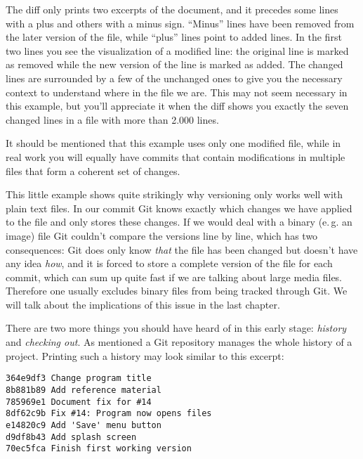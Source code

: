 \documentclass[../../LilyPond-Tutorials]{subfiles}
\begin{document}
The diff only prints two excerpts of the document, and it precedes some lines with a plus and others with a minus sign.
“Minus” lines have been removed from the later version of the file, while “plus” lines point to added lines.
In the first two lines you see the visualization of a modified line: the original line is marked as removed while the new version of the line is marked as added.
The changed lines are surrounded by a few of the unchanged ones to give you the necessary context to understand where in the file we are.
This may not seem necessary in this example, but you'll appreciate it when the diff shows you exactly the seven changed lines in a file with more than 2.000 lines.

It should be mentioned that this example uses only one modified file, while in real work you will equally have commits that contain modifications in multiple files that form a coherent set of changes.

This little example shows quite strikingly why versioning only works well with plain text files.
In our commit Git knows exactly which changes we have applied to the file and only stores these changes.
If we would deal with a binary (e.\,g. an image) file  Git couldn't compare the versions line by line, which has two consequences:
Git does only know \emph{that} the file has been changed but doesn't have any idea \emph{how}, and it is forced to store a complete version of the file for each commit, which can sum up quite fast if we are talking about large media files.
Therefore one usually excludes binary files from being tracked through Git.
We will talk about the implications of this issue in the last chapter.

\medskip
There are two more things you should have heard of in this early stage: \emph{history} and \emph{checking out}.
As mentioned a Git repository manages the whole history of a project.
Printing such a history may look similar to this excerpt:

\begin{lstlisting}[frame=single]
364e9df3 Change program title
8b881b89 Add reference material
785969e1 Document fix for #14
8df62c9b Fix #14: Program now opens files
e14820c9 Add 'Save' menu button
d9df8b43 Add splash screen
70ec5fca Finish first working version
\end{lstlisting}
\end{document}
